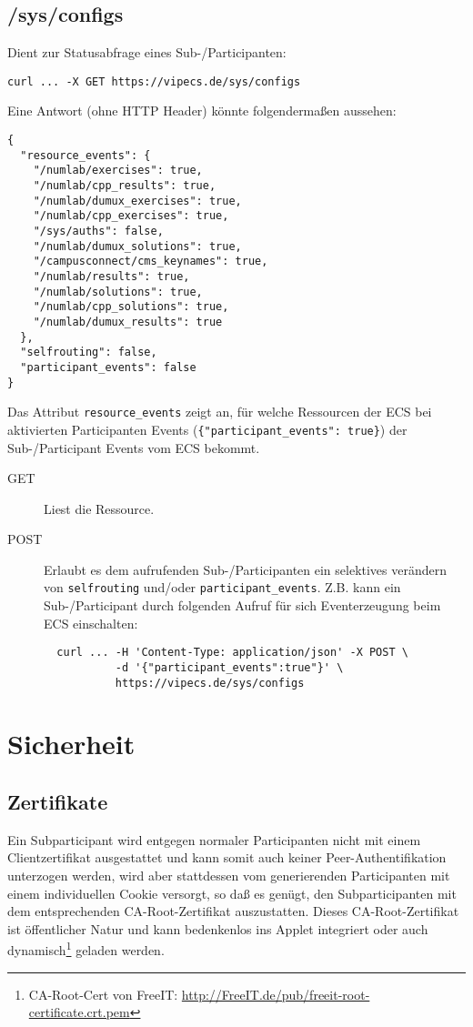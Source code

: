 \documentclass[12pt,a4paper]{article}
\begin{document}
\subsection{/sys/configs}
Dient zur Statusabfrage eines Sub-/Participanten:
\begin{verbatim}
curl ... -X GET https://vipecs.de/sys/configs
\end{verbatim}
Eine Antwort (ohne HTTP Header) könnte folgendermaßen aussehen:
\begin{verbatim}
{
  "resource_events": {
    "/numlab/exercises": true,
    "/numlab/cpp_results": true,
    "/numlab/dumux_exercises": true,
    "/numlab/cpp_exercises": true,
    "/sys/auths": false,
    "/numlab/dumux_solutions": true,
    "/campusconnect/cms_keynames": true,
    "/numlab/results": true,
    "/numlab/solutions": true,
    "/numlab/cpp_solutions": true,
    "/numlab/dumux_results": true
  },
  "selfrouting": false,
  "participant_events": false
}
\end{verbatim}
Das Attribut \texttt{resource\_events} zeigt an, für welche Ressourcen der ECS
bei aktivierten Participanten Events (\verb#{"participant_events": true}#)
der Sub-/Participant Events vom ECS bekommt.
\begin{description}
  \item[GET] Liest die Ressource.
  \item[POST] Erlaubt es dem aufrufenden Sub-/Participanten  ein selektives
  verändern von \texttt{selfrouting} und/oder \texttt{participant\_events}.
  Z.B. kann ein Sub-/Participant durch folgenden Aufruf für sich Eventerzeugung
  beim ECS einschalten:
  \begin{verbatim}
  curl ... -H 'Content-Type: application/json' -X POST \
           -d '{"participant_events":true"}' \
           https://vipecs.de/sys/configs
  \end{verbatim}
\end{description}

\section{Sicherheit}
\subsection{Zertifikate}
Ein Subparticipant wird entgegen normaler Participanten nicht mit einem
Clientzertifikat ausgestattet und kann somit auch keiner Peer-Authentifikation
unterzogen werden, wird aber stattdessen vom generierenden Participanten mit
einem individuellen Cookie versorgt, so daß es genügt, den Subparticipanten mit
dem entsprechenden CA-Root-Zertifikat auszustatten. Dieses CA-Root-Zertifikat
ist öffentlicher Natur und kann bedenkenlos ins Applet integriert oder auch
dynamisch\footnote{CA-Root-Cert von FreeIT:
\url{http://FreeIT.de/pub/freeit-root-certificate.crt.pem}} geladen werden.
\end{document}
